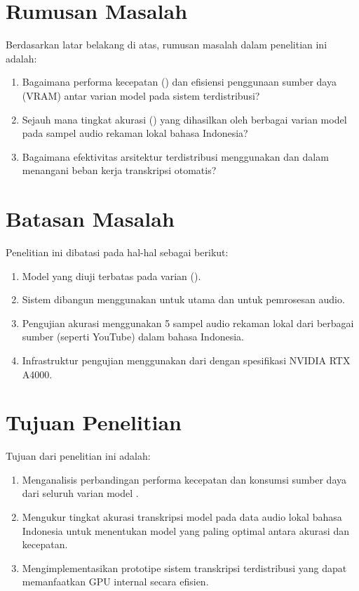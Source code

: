 \section{Rumusan Masalah}
Berdasarkan latar belakang di atas, rumusan masalah dalam penelitian ini adalah:
\begin{enumerate}
    \item Bagaimana performa kecepatan () dan efisiensi penggunaan sumber daya (VRAM) antar varian model  pada sistem terdistribusi?
    \item Sejauh mana tingkat akurasi () yang dihasilkan oleh berbagai varian model  pada sampel audio rekaman lokal bahasa Indonesia?
    \item Bagaimana efektivitas arsitektur terdistribusi menggunakan  dan  dalam menangani beban kerja transkripsi otomatis?
\end{enumerate}

\section{Batasan Masalah}
Penelitian ini dibatasi pada hal-hal sebagai berikut:
\begin{enumerate}
    \item Model yang diuji terbatas pada varian  ().
    \item Sistem dibangun menggunakan  untuk  utama dan  untuk  pemrosesan audio.
    \item Pengujian akurasi menggunakan 5 sampel audio rekaman lokal dari berbagai sumber (seperti YouTube) dalam bahasa Indonesia.
    \item Infrastruktur pengujian menggunakan  dari  dengan spesifikasi NVIDIA RTX A4000.
\end{enumerate}

\section{Tujuan Penelitian}
Tujuan dari penelitian ini adalah:
\begin{enumerate}
    \item Menganalisis perbandingan performa kecepatan dan konsumsi sumber daya dari seluruh varian model .
    \item Mengukur tingkat akurasi transkripsi model  pada data audio lokal bahasa Indonesia untuk menentukan model yang paling optimal antara akurasi dan kecepatan.
    \item Mengimplementasikan prototipe sistem transkripsi terdistribusi yang dapat memanfaatkan  GPU internal secara efisien.
\end{enumerate}

